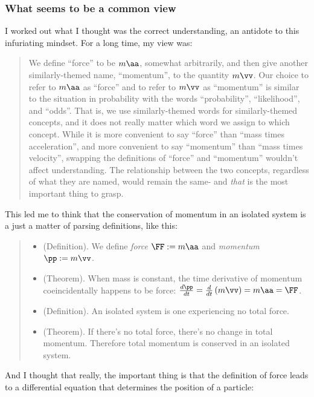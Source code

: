\documentclass{article}
\begin{document}
\subsubsection*{What seems to be a common view}

I worked out what I thought was the correct understanding, an antidote to this infuriating mindset. For a long time, my view was:

\begin{quote}
   We define ``force'' to be $m \aa$, somewhat arbitrarily, and then give another similarly-themed name, ``momentum'', to the quantity $m \vv$. Our choice to refer to $m \aa$ as ``force'' and to refer to $m \vv$ as ``momentum'' is similar to the situation in probability with the words ``probability'', ``likelihood'', and ``odds''. That is, we use similarly-themed words for similarly-themed concepts, and it does not really matter which word we assign to which concept. While it is more convenient to say ``force'' than ``mass times acceleration'', and more convenient to say ``momentum'' than ``mass times velocity'', swapping the definitions of ``force'' and ``momentum'' wouldn't affect understanding. The relationship between the two concepts, regardless of what they are named, would remain the same- and \textit{that} is the most important thing to grasp.
\end{quote}

This led me to think that the conservation of momentum in an isolated system is a just a matter of parsing definitions, like this:

\begin{quote}
    \begin{itemize}
        \item (Definition). We define \textit{force} $\FF := m \aa$ and \textit{momentum} $\pp := m \vv$.
        \item (Theorem). When mass is constant, the time derivative of momentum coeincidentally happens to be force: $\frac{d\pp}{dt} = \frac{d}{dt}\left(m\vv\right) = m\aa = \FF$.
        \item (Definition). An isolated system is one experiencing no total force.
        \item (Theorem). If there's no total force, there's no change in total momentum. Therefore total momentum is conserved in an isolated system.
    \end{itemize}
\end{quote}

And I thought that really, the important thing is that the definition of force leads to a differential equation that determines the position of a particle:
\end{document}
